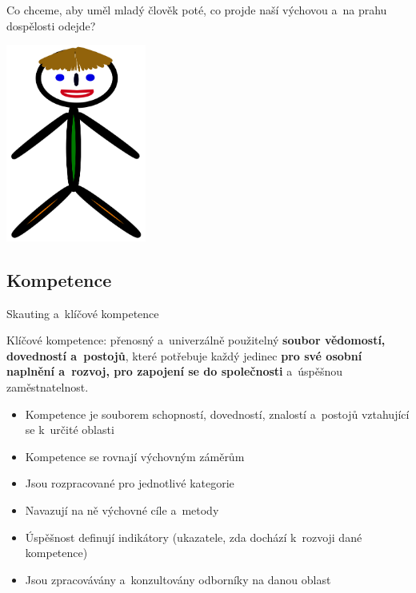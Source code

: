 \documentclass[compress,xelatex,xcolor=dvipsnames,print]{beamer}
\begin{document}
\begin{frame}{Co chceme, aby uměl mladý člověk poté, co projde naší výchovou a~na prahu dospělosti odejde?}
\begin{center}
\includegraphics[height=6.5cm]{pepicek.png}
\end{center}
\end{frame}

\subsection{Kompetence}

\begin{frame}{Skauting a~klíčové kompetence}
\begin{center}
Klíčové kompetence: přenosný a~univerzálně použitelný \textbf{soubor vědomostí, dovedností a~postojů}, které potřebuje každý jedinec \textbf{pro své osobní naplnění a~rozvoj, pro zapojení se do společnosti} a~úspěšnou zaměstnatelnost.
\end{center}
\begin{itemize}
\item Kompetence je souborem schopností, dovedností, znalostí a~postojů vztahující se k~určité oblasti
\item Kompetence se rovnají výchovným záměrům
\item Jsou rozpracované pro jednotlivé kategorie
\item Navazují na ně výchovné cíle a~metody
\item Úspěšnost definují indikátory (ukazatele, zda dochází k~rozvoji dané kompetence)
\item Jsou zpracovávány a~konzultovány odborníky na danou oblast
\end{itemize}
\end{frame}
\end{document}
